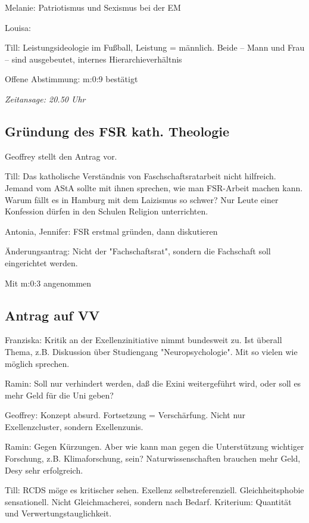 \documentclass[ngerman,headheight=70pt]{scrartcl}
\begin{document}
    Melanie: Patriotismus und Sexismus bei der EM

    Louisa:

    Till: Leistungsideologie im Fußball, Leistung = männlich.
    Beide – Mann und Frau – sind ausgebeutet, internes Hierarchieverhältnis

    Offene Abstimmung: m:0:9 bestätigt

    \textit{Zeitansage: 20.50 Uhr}

    \subsection{Gründung des FSR kath. Theologie}

    Geoffrey stellt den Antrag vor.

    Till: Das katholische Verständnis von Faschschaftsratarbeit nicht hilfreich.
    Jemand vom AStA sollte mit ihnen sprechen, wie man FSR-Arbeit machen kann.
    Warum fällt es in Hamburg mit dem Laizismus so schwer? Nur Leute einer
    Konfession dürfen in den Schulen Religion unterrichten.

    Antonia, Jennifer: FSR erstmal gründen, dann diskutieren

    Änderungsantrag: Nicht der "Fachschaftsrat", sondern die Fachschaft soll eingerichtet werden.

    Mit m:0:3 angenommen

    \subsection{Antrag auf VV}

    Franziska: Kritik an der Exellenzinitiative nimmt bundesweit zu. Ist überall
    Thema, z.B. Diskussion über Studiengang "Neuropsychologie". Mit so vielen wie
    möglich sprechen.

    Ramin: Soll nur verhindert werden, daß die Exini weitergeführt wird, oder
    soll es mehr Geld für die Uni geben?

    Geoffrey: Konzept absurd. Fortsetzung = Verschärfung. Nicht nur Exellenzcluster,
    sondern Exellenzunis.

    Ramin: Gegen Kürzungen. Aber wie kann man gegen die Unterstützung wichtiger
    Forschung, z.B. Klimaforschung, sein?
    Naturwissenschaften brauchen mehr Geld, Desy sehr erfolgreich.

    Till: RCDS möge es kritischer sehen. Exellenz selbstreferenziell.
    Gleichheitsphobie sensationell. Nicht Gleichmacherei, sondern nach Bedarf.
    Kriterium: Quantität und Verwertungstauglichkeit.
\end{document}
